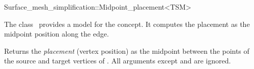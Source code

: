 

\begin{ccRefClass}{Surface_mesh_simplification::Midpoint_placement<TSM>}


\ccDefinition

The class \ccRefName\ provides a model for the  concept. 
It computes the placement as the midpoint position along the edge.


\ccIsModel
{}

\ccCreation
{}  %

  {Returns the {\em placement} (vertex position) as the midpoint between 
  the points of the source and target vertices of  . All arguments
  except  and  are ignored.
  }

\end{ccRefClass}


